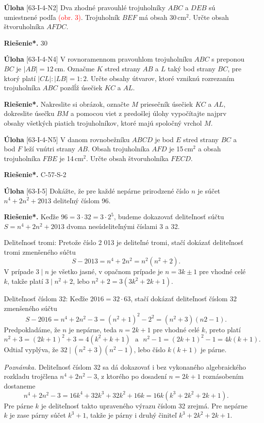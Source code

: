 \documentclass{article}
\newcommand{\rieh}{\textbf{Riešenie*.} }
\newcommand\todo[1]{\noindent\textcolor{red}{(#1)}}
\newcommand{\problem}[3]{
  \begin{tcolorbox}[breakable,notitle,boxrule=0pt,colback=light-gray,colframe=light-gray]
    \textbf{Úloha}
    [#1] #2
  \end{tcolorbox}
  \noindent#3
}
\begin{document}
\problem{63-I-4-N2}{
Dva zhodné pravouhlé trojuholníky $ABC$ a $DEB$ sú umiestnené podľa \todo{obr. 3}. Trojuholník $BEF$ má obsah 30\,cm$^2$. Určte obsah štvoruholníka $AFDC$.
}{
\rieh 30
}

\problem{63-I-4-N4}{
V rovnoramennom pravouhlom trojuholníku $ABC$ s preponou $BC$ je $|AB| = 12$\,cm. Označme $K$ stred strany $AB$ a $L$ taký bod strany $BC$, pre ktorý platí $|CL| : |LB|= 1 : 2$. Určte obsahy útvarov, ktoré vzniknú rozrezaním trojuholníka $ABC$ pozdĺž úsečiek $KC$ a $AL$.
}{
\rieh Nakreslite si obrázok, označte $M$ priesečník úsečiek $KC$ a $AL$, dokreslite úsečku $BM$ a pomocou viet z predošlej úlohy vypočítajte najprv obsahy všetkých piatich trojuholníkov, ktoré majú spoločný vrchol $M$.
}


\problem{63-I-4-N5}{
V danom rovnobežníku $ABCD$ je bod $E$ stred strany $BC$ a bod $F$ leží vnútri strany $AB$. Obsah trojuholníka $AFD$ je 15\,cm$^2$ a obsah trojuholníka $FBE$ je 14\,cm$^2$. Určte obsah štvoruholníka $FECD$.
}{
\rieh C-57-S-2
}


\problem{63-I-5}{Dokážte, že pre každé nepárne prirodzené číslo $n$ je súčet $n^4 + 2n^2 + 2 013$ deliteľný číslom 96.
}{
\rieh Keďže $96 = 3 \cdot 32 = 3 \cdot 2^5$, budeme dokazovať deliteľnosť súčtu $S = n^4+ 2n^2 + 2 013$ dvoma nesúdeliteľnými číslami 3 a 32.

Deliteľnosť tromi: Pretože číslo 2 013 je deliteľné tromi, stačí dokázať deliteľnosť tromi zmenšeného súčtu
$$S - 2 013 = n^4 + 2n^2= n^2(n^2+ 2).$$
V prípade $3 \mid n$ je všetko jasné, v opačnom prípade je $n = 3k \pm 1$ pre vhodné celé $k$, takže platí $3 \mid n^2 + 2$, lebo $n^2 + 2 = 3(3k^2 + 2k + 1)$.

Deliteľnosť číslom 32: Keďže $2 016 = 32 \cdot 63$, stačí dokázať deliteľnosť číslom 32 zmenšeného súčtu
$$S - 2 016 = n^4+ 2n^2 - 3 = (n^2+ 1)^2 - 2^2= (n^2+ 3)(n2 - 1).$$
Predpokladáme, že $n$ je nepárne, teda $n = 2k + 1$ pre vhodné celé $k$, preto platí
$$n^2+ 3 = (2k + 1)^2+ 3 = 4(k^2+ k + 1)\ \ \ \mathrm{a} \ \ \ n^2 - 1 = (2k + 1)^2 - 1 = 4k(k + 1).$$
Odtiaľ vyplýva, že $32 \mid (n^2 + 3)(n^2 - 1)$, lebo číslo $k(k + 1)$ je párne.

\textit{Poznámka.} Deliteľnosť číslom 32 sa dá dokazovať i bez vykonaného algebraického rozkladu trojčlena $n^4 + 2n^2 - 3$, z ktorého po dosadení $n = 2k + 1$ roznásobením dostaneme
$$n^4+ 2n^2 - 3 = 16k^4+ 32k^3+ 32k^2+ 16k = 16k(k^3+ 2k^2+ 2k + 1).$$
Pre párne $k$ je deliteľnosť takto upraveného výrazu číslom 32 zrejmá. Pre nepárne $k$ je zase párny súčet $k^3 + 1$, takže je párny i druhý činiteľ $k^3 + 2k^2 + 2k + 1$.
}
\end{document}
